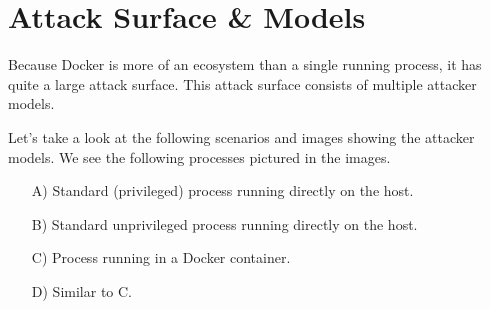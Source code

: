 \section{Attack Surface \& Models}\label{section:attack-surface-models}
Because Docker is more of an ecosystem than a single running process, it has quite a large attack surface. This attack surface consists of multiple attacker models.

\hfill

Let's take a look at the following scenarios and images showing the attacker models.
We see the following processes pictured in the images.
\begin{enumerate}
    \item[A)] Standard (privileged) process running directly on the host.
    \item[B)] Standard unprivileged process running directly on the host.
    \item[C)] Process running in a Docker container.
    \item[D)] Similar to C.
\end{enumerate}




